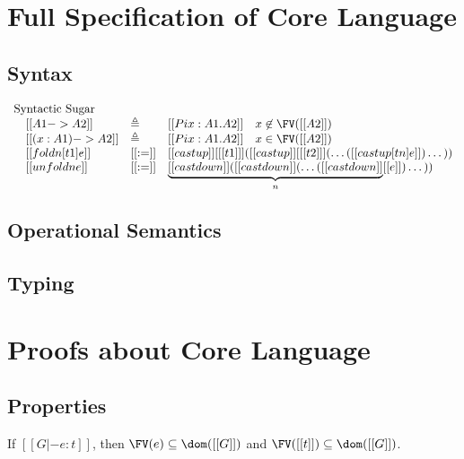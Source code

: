 \section{Full Specification of Core Language}

\subsection{Syntax}
\gram{\otte\ottinterrule
        \ottG\ottinterrule
        \ottv}
\[
    \begin{array}{llll}
     \text{Syntactic Sugar}\\
     \quad [[A1->A2]] & \triangleq & [[Pi x:A1.A2]] \quad x \not \in
\FV([[A2]]) \\
     \quad [[(x:A1)->A2]] & \triangleq & [[Pi x:A1.A2]] \quad x \in \FV([[A2]])
\\
     \quad [[foldn [t1] e]] & [[:=]] & [[castup]] [ [[t1]] ] ([[castup]] [
[[t2]] ] (\dots ( [[castup [tn] e]] ) \dots )) \\
     \quad [[unfoldn e]] & [[:=]] & \underbrace{[[castdown]] ([[castdown]]
(\dots ( [[castdown]]}_n [[e]]) \dots ))
    \end{array}
\]

\subsection{Operational Semantics}
\ottdefnstep{}
\ottusedrule{\ottdruleSXXMu{}}

\subsection{Typing}
\ottdefnctx{}
\ottdefnexpr{}
\ottusedrule{\ottdruleTXXMu{}}

\section{Proofs about Core Language}
\subsection{Properties}
\begin{lem}\label{lem:appendix:free}
    If $[[G |- e:t]]$, then $\FV(e) \subseteq \dom([[G]])$ and $\FV([[t]])
\subseteq \dom([[G]])$.
\end{lem}

